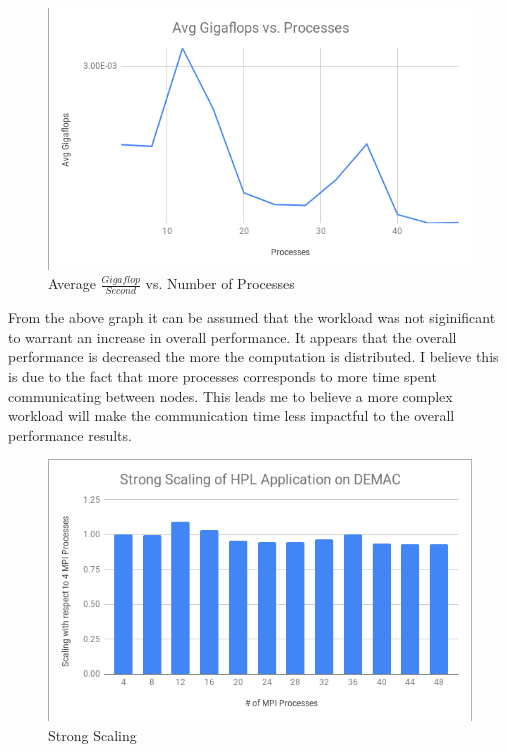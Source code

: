 \documentclass[letterpaper,12pt]{article}
\begin{document}
\clearpage


\begin{figure}
  \includegraphics[width = \linewidth]{avgGig.png}
  \caption{Average $\frac{Gigaflop}{Second}$ vs. Number of Processes}
  \end{figure}
From the above graph it can be assumed that the workload was not siginificant to warrant an increase in overall performance. It appears that the overall performance is decreased the more the computation is distributed. I believe this is due to the fact that more processes corresponds to more time spent communicating between nodes. This leads me to believe a more complex workload will make the communication time less impactful to the overall performance results.

\clearpage

\begin{figure}
  \includegraphics[width = \linewidth]{strongScaling.png}
  \caption{Strong Scaling}
\end{figure}
\end{document}
